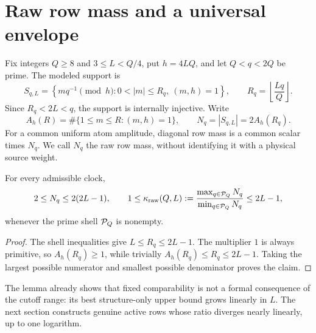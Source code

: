 \section{Raw row mass and a universal envelope}

Fix integers $Q\ge8$ and $3\le L<Q/4$, put $h=4LQ$, and let $Q<q<2Q$ be prime.
The modeled support is
\[
 S_{q,L}=\left\{mq^{-1}\pmod h:
 0<|m|\le R_q,\ (m,h)=1\right\},
 \qquad R_q=\left\lfloor\frac{Lq}{Q}\right\rfloor .
\]
Since $R_q<2L<q$, the support is internally injective.  Write
\[
 A_h(R)=\#\{1\le m\le R:(m,h)=1\},
 \qquad N_q=|S_{q,L}|=2A_h(R_q).
\]
For a common uniform atom amplitude, diagonal row mass is a common scalar times
$N_q$.  We call $N_q$ the raw row mass, without identifying it with a physical source
weight.

\begin{lemma}\label{lem:envelope}
For every admissible clock,
\[
 2\le N_q\le2(2L-1),
 \qquad
 1\le \kappa_{\mathrm{raw}}(Q,L):=
 \frac{\max_{q\in\mathcal P_Q}N_q}{\min_{q\in\mathcal P_Q}N_q}\le2L-1,
\]
whenever the prime shell $\mathcal P_Q$ is nonempty.
\end{lemma}

\begin{proof}
The shell inequalities give $L\le R_q\le2L-1$.  The multiplier $1$ is always
primitive, so $A_h(R_q)\ge1$, while trivially $A_h(R_q)\le R_q\le2L-1$.
Taking the largest possible numerator and smallest possible denominator proves the
claim.
\end{proof}

The lemma already shows that fixed comparability is not a formal consequence of the
cutoff range: its best structure-only upper bound grows linearly in $L$.  The next
section constructs genuine active rows whose ratio diverges nearly linearly, up to one
logarithm.
